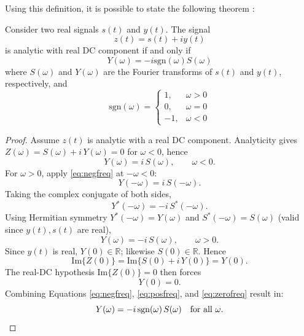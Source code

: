 Using this definition, it is possible to state the following theorem \cite{Boashash2016Chapter1TimeFrequency}:
\begin{theorem}
    Consider two real signals $s(t)$ and $y(t)$. The signal
    \begin{equation}
        z(t) = s(t) + iy(t)
        \label{eq:analytic-conjugate}
    \end{equation}
    is analytic with real DC component if and only if
    \begin{equation}
        Y(\omega) = -i \text{sgn}(\omega) S(\omega)
        \label{eq:FT-relations}
    \end{equation}
    where $S(\omega)$ and $Y(\omega)$ are the Fourier transforms of $s(t)$ and $y(t)$, respectively, and 
    \begin{equation}
        \text{sgn}(\omega) = \begin{cases}
            1, & \omega > 0 \\
            0, & \omega = 0 \\
            -1, & \omega < 0
        \end{cases}
    \end{equation}
\end{theorem}
\begin{proof}
Assume $z(t)$ is analytic with a real DC component. Analyticity gives $Z(\omega) = S(\omega) + i\,Y(\omega) = 0$ for $\omega<0$, hence
\begin{equation}
Y(\omega) = i\,S(\omega), \qquad \omega<0. \label{eq:negfreq}
\end{equation}
For $\omega>0$, apply \eqref{eq:negfreq} at $-\omega<0$:
\begin{equation}
Y(-\omega) = i\,S(-\omega). \label{eq:negfreq-applied}
\end{equation}
Taking the complex conjugate of both sides,
\begin{equation}
Y^*(-\omega) = -i\,S^*(-\omega). \label{eq:conjugate}
\end{equation}
Using Hermitian symmetry $Y^*(-\omega) = Y(\omega)$ and $S^*(-\omega) = S(\omega)$ (valid since $y(t), s(t)$ are real),
\begin{equation}
Y(\omega) = -i\,S(\omega), \qquad \omega>0. \label{eq:posfreq}
\end{equation}
Since $y(t)$ is real, $Y(0) \in \mathbb{R}$; likewise $S(0)\in\mathbb{R}$. Hence
\begin{equation}
\mathrm{Im}\{Z(0)\} = \mathrm{Im}\{S(0) + i\,Y(0)\} = Y(0). \label{eq:imz0}
\end{equation}
The real-DC hypothesis $\mathrm{Im}\{Z(0)\}=0$ then forces
\begin{equation}
Y(0) = 0. \label{eq:zerofreq}
\end{equation}
Combining Equations \eqref{eq:negfreq}, \eqref{eq:posfreq}, and \eqref{eq:zerofreq} result in:
\begin{equation}
Y(\omega) = -i\,\mathrm{sgn}(\omega)\,S(\omega) \quad \text{for all } \omega. \qedhere
\label{eq:final}
\end{equation}
\end{proof}


